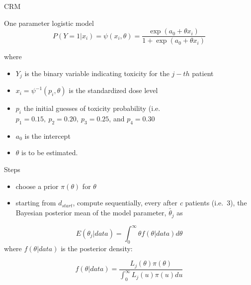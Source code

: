 \documentclass{beamer}
\begin{document}
\begin{frame}{CRM}

One parameter logistic model 
$$ 
P(Y=1\vert x_i)=\psi(x_i,\theta)=\frac{\exp(a_0+\theta x_i)}{1+\exp(a_0+\theta x_i)}
$$ 


where

\begin{itemize}
\itemsep1pt\parskip0pt
\item
  $Y_{j}$ is the binary variable indicating toxicity for the $j-th$
  patient
\item
  $x_{i}=\psi^{-1}\left(p_{i},\theta\right)$ is the standardized dose
  level
\item
  $p_i$ the initial guesses of toxicity probability (i.e.
  $p_1=0.15,\ p_2=0.20,\ p_3=0.25$, and $p_4=0.30$
\item
  $a_0$ is the intercept
\item
  $\theta$ is to be estimated.
\end{itemize}

\end{frame}



\begin{frame}{Steps}

\begin{itemize}
\itemsep1pt\parskip0pt
\item
  choose a prior $\pi\left(\theta\right)$ for $\theta$
\item
  starting from $d_{start}$, compute sequentially, every after
  \emph{c} patients (i.e.~3), the Bayesian posterior mean of the model
  parameter, $\tilde{\theta_{j}}$ as
\end{itemize}



$$
E\left(\theta_{j}\vert data\right)=\int_0^\infty \theta f\left(\theta\vert data\right) d\theta
$$ where $f\left(\theta\vert data\right)$ is the posterior density:

$$
f\left(\theta\vert data\right)=\frac{L_{j}\left(\theta\right)\pi\left(\theta\right)}{\int_0^\infty L_{j}\left(u\right)\pi\left(u\right) du}
$$

\end{frame}
\end{document}
